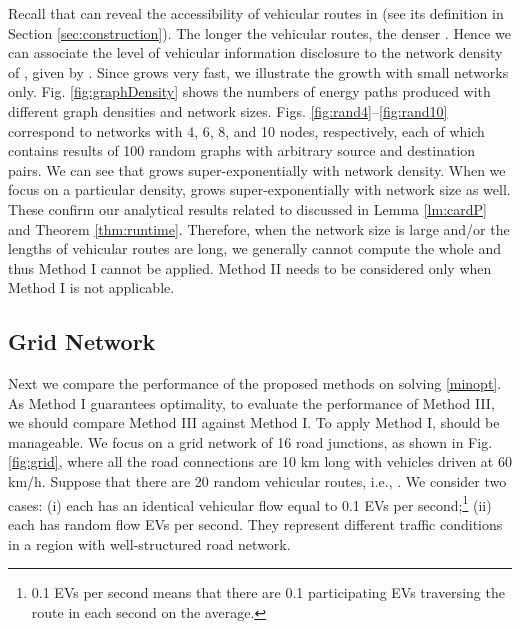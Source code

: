 \documentclass[journal]{IEEEtran}
\begin{document}
\begin{figure*}[!t]
	\begin{center}
	\end{center}
	\caption{Number of energy paths produced with different graph density and network size.}
  \label{fig:graphDensity}
\end{figure*}
Recall that  can reveal the accessibility of vehicular routes in  (see its definition in Section \ref{sec:construction}).
The longer the vehicular routes, the denser  . Hence we can associate the level of vehicular information disclosure to the network density of  , given by . 
Since  grows very fast, we illustrate the growth with small networks only.
Fig. \ref{fig:graphDensity} shows the numbers of energy paths produced with different graph densities and network sizes. Figs. \ref{fig:rand4}--\ref{fig:rand10} correspond to networks with 4, 6, 8, and 10 nodes, respectively, each of which contains results of 100 random graphs with arbitrary source and destination pairs. We can see that  grows super-exponentially with network density. When we focus on a particular density,  grows  super-exponentially with network size as well. These confirm our analytical results related to  discussed in Lemma \ref{lm:cardP} and Theorem \ref{thm:runtime}. Therefore, when the network size is large and/or the lengths of vehicular routes are long, we generally cannot compute the whole  and thus Method I cannot be applied. Method II needs to be considered only when Method I is not applicable.






\subsection{Grid Network} \label{gridNetwork}
Next we compare the performance of the proposed methods on solving \eqref{minopt}. As Method I guarantees optimality, to evaluate the performance of Method III, we should compare Method III against Method I. To apply Method I,  should be manageable. We focus on a grid network of 16 road junctions, as shown in Fig. \ref{fig:grid}, where all the road connections are 10 km long with vehicles driven at 60 km/h. Suppose that there are 20 random vehicular routes, i.e., . We consider two cases: (i) each  has an identical vehicular flow  equal to 0.1 EVs per second;\footnote{0.1 EVs per second means that there are 0.1 participating EVs traversing the route in each second on the average.} (ii) each   has random flow  EVs per second. They represent different traffic conditions in a region with well-structured road network.
\end{document}
